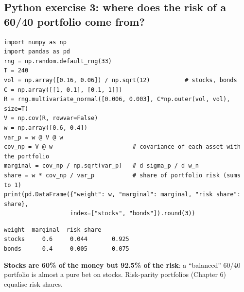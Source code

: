 \documentclass[11pt,a4paper]{report}
\begin{document}
\subsection*{Python exercise 3: where does the risk of a 60/40 portfolio come from?}
\begin{lstlisting}
import numpy as np
import pandas as pd
rng = np.random.default_rng(33)
T = 240
vol = np.array([0.16, 0.06]) / np.sqrt(12)          # stocks, bonds
C = np.array([[1, 0.1], [0.1, 1]])
R = rng.multivariate_normal([0.006, 0.003], C*np.outer(vol, vol), size=T)
V = np.cov(R, rowvar=False)
w = np.array([0.6, 0.4])
var_p = w @ V @ w
cov_np = V @ w                       # covariance of each asset with the portfolio
marginal = cov_np / np.sqrt(var_p)   # d sigma_p / d w_n
share = w * cov_np / var_p           # share of portfolio risk (sums to 1)
print(pd.DataFrame({"weight": w, "marginal": marginal, "risk share": share},
                   index=["stocks", "bonds"]).round(3))
\end{lstlisting}
\begin{lstlisting}[style=out]
        weight  marginal  risk share
stocks     0.6     0.044       0.925
bonds      0.4     0.005       0.075
\end{lstlisting}
\textbf{Stocks are 60\% of the money but 92.5\% of the risk}: a ``balanced'' 60/40
portfolio is almost a pure bet on stocks. Risk-parity portfolios (Chapter 6)
equalise risk shares.
\end{document}
